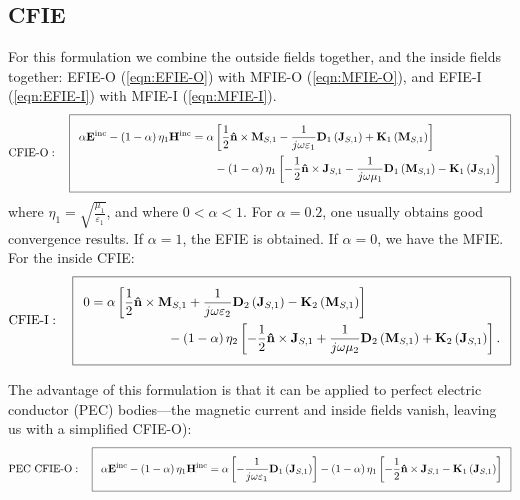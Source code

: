 \documentclass[a4paper,10pt]{book}
\newcommand{\field}[1]{\mathbf{#1}}
\newcommand{\current}[1]{\mathbf{#1}}
\newcommand{\vect}[1]{\mathbf{#1}}
\newcommand{\operator}[1]{\mathbf{#1}}
\begin{document}
\subsection{CFIE}
%
\par
For this formulation we combine the outside fields together, and the inside fields together: EFIE-O (\ref{eqn:EFIE-O}) with MFIE-O (\ref{eqn:MFIE-O}), and EFIE-I (\ref{eqn:EFIE-I}) with MFIE-I (\ref{eqn:MFIE-I}).
\begin{equation}\label{eqn:CFIE-O}
  \addtolength{\fboxsep}{5pt} 
 \text{CFIE-O}: \quad   \boxed{ 
   \begin{split} 
      \alpha \field{E}^\text{inc} - \left(1-\alpha \right) \eta_1\field{H}^\text{inc} &= \alpha \left[\frac{1}{2} \vect{\hat{n}} \times \current{M}_{S,1} - \frac{1}{j \omega \varepsilon_1} \operator{D}_1 \left( \current{J}_{S,1}\right) + \operator{K}_1 \left(\current{M}_{S,1}\right) \right]  \\ 
      & \qquad - \left(1-\alpha \right) \eta_1 \left[ - \frac{1}{2} \vect{\hat{n}} \times \current{J}_{S,1} - \frac{1}{j \omega \mu_1} \operator{D}_1 \left( \current{M}_{S,1}\right) - \operator{K}_1 \left(\current{J}_{S,1}\right) \right]
   \end{split} 
   } 
\end{equation}
where $\eta_1 = \sqrt{\frac{\mu_1}{\varepsilon_1}}$, and where $0<\alpha<1$. For $\alpha = 0.2$, one usually obtains good convergence results. If $\alpha = 1$, the EFIE is obtained. If $\alpha = 0$, we have the MFIE. For the inside CFIE:
\begin{equation}\label{eqn:CFIE-I}
  \addtolength{\fboxsep}{5pt} 
 \text{CFIE-I}: \quad   \boxed{ 
   \begin{split} 
      0 &= \alpha \left[\frac{1}{2} \vect{\hat{n}} \times \current{M}_{S,1} + \frac{1}{j \omega \varepsilon_2} \operator{D}_2\left(\current{J}_{S,1}\right) -  \operator{K}_2\left( \current{M}_{S,1}\right) \right] \\ &\qquad \qquad \qquad - \left(1-\alpha \right) \eta_2 \left[ - \frac{1}{2} \vect{\hat{n}} \times \current{J}_{S,1} + \frac{1}{j \omega \mu_2} \operator{D}_2\left(\current{M}_{S,1}\right) +  \operator{K}_2\left( \current{J}_{S,1}\right) \right].
   \end{split} 
   } 
\end{equation}
%
\par
The advantage of this formulation is that it can be applied to perfect electric conductor (PEC) bodies---the magnetic current and inside fields vanish, leaving us with a simplified CFIE-O):
\begin{equation}\label{eqn:CFIE-O-PEC}
  \addtolength{\fboxsep}{5pt} 
 \text{PEC CFIE-O}: \quad   \boxed{ 
      \alpha \field{E}^\text{inc} - \left(1-\alpha \right) \eta_1\field{H}^\text{inc} = \alpha \left[- \frac{1}{j \omega \varepsilon_1} \operator{D}_1 \left( \current{J}_{S,1}\right)\right]  - \left(1-\alpha \right) \eta_1 \left[ - \frac{1}{2} \vect{\hat{n}} \times \current{J}_{S,1} - \operator{K}_1 \left(\current{J}_{S,1}\right) \right]
   } 
\end{equation}







\end{document}
